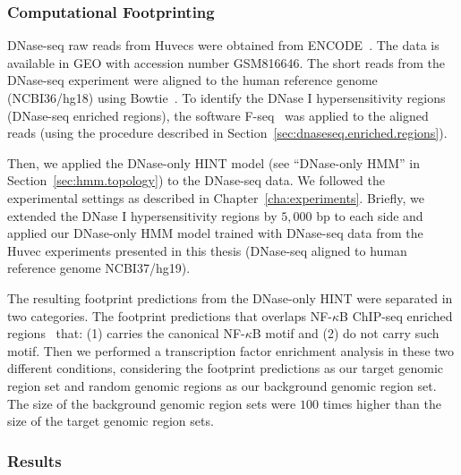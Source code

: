 \subsubsection{Computational Footprinting}
\label{sec:cs2.computational.footprinting}

DNase-seq raw reads from Huvecs were obtained from ENCODE~\cite{encode2012}. The data is available in GEO with accession number GSM816646. The short reads from the DNase-seq experiment were aligned to the human reference genome~\cite{encode2012} (NCBI36/hg18) using Bowtie~\cite{langmead2012}. To identify the DNase I hypersensitivity regions (DNase-seq enriched regions), the software F-seq~\cite{boyle2008b} was applied to the aligned reads (using the procedure described in Section~\ref{sec:dnaseseq.enriched.regions}).

Then, we applied the DNase-only HINT model (see ``DNase-only HMM'' in Section~\ref{sec:hmm.topology}) to the DNase-seq data. We followed the experimental settings as described in Chapter~\ref{cha:experiments}. Briefly, we extended the DNase I hypersensitivity regions by $5,000$ bp to each side and applied our DNase-only HMM model trained with DNase-seq data from the Huvec experiments presented in this thesis (DNase-seq aligned to human reference genome NCBI37/hg19).

The resulting footprint predictions from the DNase-only HINT were separated in two categories. The footprint predictions that overlaps NF-$\kappa$B ChIP-seq enriched regions~\cite{papantonis2012} that: (1) carries the canonical NF-$\kappa$B motif and (2) do not carry such motif. Then we performed a transcription factor enrichment analysis in these two different conditions, considering the footprint predictions as our target genomic region set and random genomic regions as our background genomic region set. The size of the background genomic region sets were $100$ times higher than the size of the target genomic region sets.

\subsubsection{Results}
\label{sec:cs2.results}

